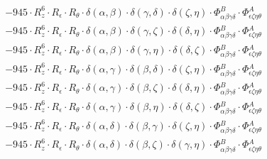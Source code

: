 \documentclass{article}
\begin{document}
\begin{equation}
\begin{array}{c}
 \\[0.2em] 		 - 945 \cdot R_{z}^{6} \cdot R_{\epsilon{}} \cdot R_{\theta{}} \cdot \delta{}\left(\alpha{}, \beta{}\right) \cdot \delta{}\left(\gamma{}, \delta{}\right) \cdot \delta{}\left(\zeta{}, \eta{}\right) \cdot \Phi{}^{B}_{\alpha{}\beta{}\gamma{}\delta{}} \cdot \Phi{}^{A}_{\epsilon{}\zeta{}\eta{}\theta{}} 
 \\[0.2em] 		 - 945 \cdot R_{z}^{6} \cdot R_{\epsilon{}} \cdot R_{\theta{}} \cdot \delta{}\left(\alpha{}, \beta{}\right) \cdot \delta{}\left(\gamma{}, \zeta{}\right) \cdot \delta{}\left(\delta{}, \eta{}\right) \cdot \Phi{}^{B}_{\alpha{}\beta{}\gamma{}\delta{}} \cdot \Phi{}^{A}_{\epsilon{}\zeta{}\eta{}\theta{}} 
 \\[0.2em] 		 - 945 \cdot R_{z}^{6} \cdot R_{\epsilon{}} \cdot R_{\theta{}} \cdot \delta{}\left(\alpha{}, \beta{}\right) \cdot \delta{}\left(\gamma{}, \eta{}\right) \cdot \delta{}\left(\delta{}, \zeta{}\right) \cdot \Phi{}^{B}_{\alpha{}\beta{}\gamma{}\delta{}} \cdot \Phi{}^{A}_{\epsilon{}\zeta{}\eta{}\theta{}} 
 \\[0.2em] 		 - 945 \cdot R_{z}^{6} \cdot R_{\epsilon{}} \cdot R_{\theta{}} \cdot \delta{}\left(\alpha{}, \gamma{}\right) \cdot \delta{}\left(\beta{}, \delta{}\right) \cdot \delta{}\left(\zeta{}, \eta{}\right) \cdot \Phi{}^{B}_{\alpha{}\beta{}\gamma{}\delta{}} \cdot \Phi{}^{A}_{\epsilon{}\zeta{}\eta{}\theta{}} 
 \\[0.2em] 		 - 945 \cdot R_{z}^{6} \cdot R_{\epsilon{}} \cdot R_{\theta{}} \cdot \delta{}\left(\alpha{}, \gamma{}\right) \cdot \delta{}\left(\beta{}, \zeta{}\right) \cdot \delta{}\left(\delta{}, \eta{}\right) \cdot \Phi{}^{B}_{\alpha{}\beta{}\gamma{}\delta{}} \cdot \Phi{}^{A}_{\epsilon{}\zeta{}\eta{}\theta{}} 
 \\[0.2em] 		 - 945 \cdot R_{z}^{6} \cdot R_{\epsilon{}} \cdot R_{\theta{}} \cdot \delta{}\left(\alpha{}, \gamma{}\right) \cdot \delta{}\left(\beta{}, \eta{}\right) \cdot \delta{}\left(\delta{}, \zeta{}\right) \cdot \Phi{}^{B}_{\alpha{}\beta{}\gamma{}\delta{}} \cdot \Phi{}^{A}_{\epsilon{}\zeta{}\eta{}\theta{}} 
 \\[0.2em] 		 - 945 \cdot R_{z}^{6} \cdot R_{\epsilon{}} \cdot R_{\theta{}} \cdot \delta{}\left(\alpha{}, \delta{}\right) \cdot \delta{}\left(\beta{}, \gamma{}\right) \cdot \delta{}\left(\zeta{}, \eta{}\right) \cdot \Phi{}^{B}_{\alpha{}\beta{}\gamma{}\delta{}} \cdot \Phi{}^{A}_{\epsilon{}\zeta{}\eta{}\theta{}} 
 \\[0.2em] 		 - 945 \cdot R_{z}^{6} \cdot R_{\epsilon{}} \cdot R_{\theta{}} \cdot \delta{}\left(\alpha{}, \delta{}\right) \cdot \delta{}\left(\beta{}, \zeta{}\right) \cdot \delta{}\left(\gamma{}, \eta{}\right) \cdot \Phi{}^{B}_{\alpha{}\beta{}\gamma{}\delta{}} \cdot \Phi{}^{A}_{\epsilon{}\zeta{}\eta{}\theta{}} 

\end{array}
\end{equation}
\end{document}
